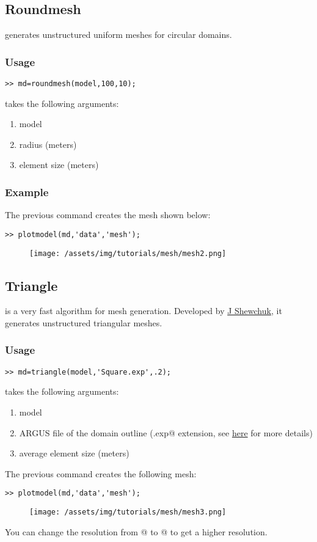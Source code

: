 \subsection{Roundmesh}%
\verb@roundmesh@ generates unstructured uniform meshes for circular domains.
\subsubsection{Usage}
\begin{verbatim}>> md=roundmesh(model,100,10);\end{verbatim}
\verb@roundmesh@ takes the following arguments:
\begin{enumerate}
	\item model
	\item radius (meters)
	\item element size (meters)
\end{enumerate}
\subsubsection{Example}
The previous command creates the mesh shown below:
\begin{verbatim}>> plotmodel(md,'data','mesh');\end{verbatim}
\begin{figure}[H]
	\begin{center}
		\texttt{[image: /assets/img/tutorials/mesh/mesh2.png]}
	\end{center}
\end{figure}
\subsection{Triangle}%
\verb@triangle@ is a very fast algorithm for mesh generation. Developed by \href{http://www.cs.cmu.edu/~quake/triangle.html}{J Shewchuk}, it generates unstructured triangular meshes.
\subsubsection{Usage}
\begin{verbatim}>> md=triangle(model,'Square.exp',.2);\end{verbatim}
\verb@triangle@ takes the following arguments:
\begin{enumerate}
	\item model
	\item ARGUS file of the domain outline (\verb@.exp@ extension, see \href{http://issm.jpl.nasa.gov/documentation/mesh/}{here} for more details)
	\item average element size (meters)
\end{enumerate}
The previous command creates the following mesh:
\begin{verbatim}>> plotmodel(md,'data','mesh');\end{verbatim}
\begin{figure}[H]
	\begin{center}
		\texttt{[image: /assets/img/tutorials/mesh/mesh3.png]}
	\end{center}
\end{figure}
You can change the resolution from @ to @ to get a higher resolution.
